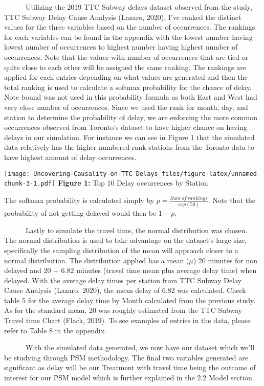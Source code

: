 \documentclass[
]{article}
\begin{document}
~~~~~~Utilizing the 2019 TTC Subway delays dataset observed from the
study, TTC Subway Delay Cause Analysis (Lazaro, 2020), I've ranked the
distinct values for the three variables based on the number of
occurrences. The rankings for each variables can be found in the
appendix with the lowest number having lowest number of occurrences to
highest number having highest number of occurrences. Note that the
values with number of occurrences that are tied or quite close to each
other will be assigned the same ranking. The rankings are applied for
each entries depending on what values are generated and then the total
ranking is used to calculate a softmax probability for the chance of
delay. Note bound was not used in this probability formula as both East
and West had very close number of occurrences. Since we used the rank
for month, day, and station to determine the probability of delay, we
are enforcing the more common occurrences observed from Toronto's
dataset to have higher chance on having delays in our simulation. For
instance we can see in Figure 1 that the simulated data relatively has
the higher numbered rank stations from the Toronto data to have highest
amount of delay occurrences.

\texttt{[image: Uncovering-Causality-on-TTC-Delays\_files/figure-latex/unnamed-chunk-3-1.pdf]}
\textbf{Figure 1:} Top 10 Delay occurrences by Station

The softmax probability is calculated simply by
\(p = \frac{Sum\ of\ rankings}{exp(50)}\). Note that the probability of
not getting delayed would then be \(1 - p\).

~~~~~~Lastly to simulate the travel time, the normal distribution was
chosen. The normal distribution is used to take advantage on the
dataset's large size, specifically the sampling distribution of the mean
will approach closer to a normal distribution. The distribution applied
has a mean (\(\mu\)) 20 minutes for non delayed and 20 + 6.82 minutes
(travel time mean plus average delay time) when delayed. With the
average delay times per station from TTC Subway Delay Cause Analysis
(Lazaro, 2020), the mean delay of 6.82 was calculated. Check table 5 for
the average delay time by Month calculated from the previous study. As
for the standard mean, 20 was roughly estimated from the TTC Subway
Travel time Chart (Flack, 2019). To see examples of entries in the data,
please refer to Table 8 in the appendix.

~~~~~~With the simulated data generated, we now have our dataset which
we'll be studying through PSM methodology. The final two variables
generated are significant as delay will be our Treatment with travel
time being the outcome of interest for our PSM model which is further
explained in the 2.2 Model section.
\end{document}
